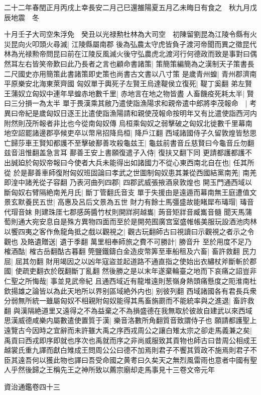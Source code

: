 二十二年春閏正月丙戌上幸長安二月己巳還雒陽夏五月乙未晦日有食之　秋九月戊辰地震　冬

十月壬子大司空朱浮免　癸丑以光禄勲杜林為大司空　初陳留劉昆為江陵令縣有火災昆向火叩頭火尋滅|{
	江陵縣屬南郡}
後為弘農太守虎皆負子渡河帝聞而異之徵昆代林為光禄勲帝問昆曰前在江陵反風滅火後守弘農虎北渡河行何德政而致是事對曰偶然耳左右皆笑帝歎曰此乃長者之言也顧命書諸策|{
	策簡策編簡為之漢制天子策書長二尺國史亦用簡策此書諸策即史策也尚書古文書以八寸策}
是歲青州蝗|{
	青州郡濟南平原樂安北海東萊齊國}
匈奴單于輿死子左賢王烏達鞮侯立復死|{
	鞮丁奚翻}
弟左賢王蒲奴立匈奴中連年旱蝗赤地數千里|{
	赤地言在地之物皆盡}
人畜饑疫死耗太半|{
	賢曰三分損一為太半}
單于畏漢乘其敝乃遣使詣漁陽求和親帝遣中郎將李茂報命　|{
	考異曰帝紀是歲匈奴日逐王比遣使詣漁陽請和親使茂報命按明年又有比遣使詣西河内附然則茂所報者非比也今從南匈奴傳}
烏桓乘匈奴之弱擊破之匈奴北徙數千里幕南地空詔罷諸邊郡亭候吏卒以幣帛招降烏桓|{
	降戶江翻}
西域諸國侍子久留敦煌皆愁思亡歸莎車王賢知都護不至擊破鄯善攻殺龜兹王|{
	龜兹前書音丘慈賢曰今龜音丘勿翻兹音沮惟翻盖急言耳}
鄯善王安上書願復遣子入侍|{
	復扶又翻下同}
更請都護都護不出誠廹於匈奴帝報曰今使者大兵未能得出如諸國力不從心東西南北自在也|{
	任其所從}
於是鄯善車師復附匈奴班固論曰孝武之世圖制匈奴患其兼從西國結黨南羌|{
	南羌即湟中諸羌從子容翻}
乃表河曲列四郡|{
	四郡武威張掖酒泉敦煌也}
開玉門通西域以斷匈奴右臂隔絶南羌月氏|{
	斷丁管翻氏音支}
單于失援由是遠遁而幕南無王庭遭值文景玄默養民五世|{
	高惠及呂后文景為五世}
財力有餘士馬彊盛故能睹犀布瑇瑁|{
	瑇音代瑁音妹}
則建珠厓七郡感蒟醬竹杖則開牂牁越巂|{
	蒟音矩牂音臧巂音髓}
聞天馬蒲萄則通大宛安息自是殊方異物四面而至於是開苑囿廣宫室盛帷帳美服玩設酒池肉林以饗四夷之客作魚龍角抵之戲以觀視之|{
	觀古玩翻師古曰視讀曰示觀視之者示之令觀也}
及賂遺贈送|{
	遺于季翻}
萬里相奉師旅之費不可勝計|{
	勝音升}
至於用度不足乃榷酒酤|{
	榷古岳翻酤古暮翻}
筦鹽鐵鑄白金造皮幣筭至車船租及六畜|{
	畜許救翻}
民力屈|{
	屈其勿翻}
財用竭因之以凶年寇盜並起道路不通直指之使始出衣繡杖斧斷斬於郡國|{
	使疏吏翻衣於旣翻斷丁亂翻}
然後勝之是以末年遂棄輪臺之地而下哀痛之詔豈非仁聖之所悔哉|{
	事並見武帝紀}
且通西域近有龍堆遠則葱嶺身熱頭痛懸度之阨淮南杜欽揚雄之論皆以為此天地所以界别區域絶外内也|{
	别彼列翻}
西域諸國各有君長兵衆分弱無所統一雖屬匈奴不相親附匈奴能得其馬畜旃罽而不能統率與之進退|{
	畜許救翻}
與漢隔絶道里又遠得之不為益棄之不為損盛德在我無取於彼故自建武以來西域思漢威德咸樂内屬數遣使置質于漢|{
	樂音洛數所角翻質音致謂侍子也}
願請都護聖上遠覽古今因時之宜辭而未許雖大禹之序西戎周公之讓白雉太宗之卻走馬義兼之矣|{
	禹貢曰西戎即序即就也序次也禹就而序之非尚威服致其貢物也師古曰昔周公相成王越裳氏重九譯而獻白雉成王問周公公曰德不加焉則君子不饗其質政不施焉則君子不臣其遠吾何以獲此物也譯曰吾受命國之黄耉曰久矣天之無烈風雷雨也意者中國有聖人乎然後歸之王稱先王之神所致以薦宗廟却走馬事見十三卷文帝元年}


資治通鑑卷四十三
